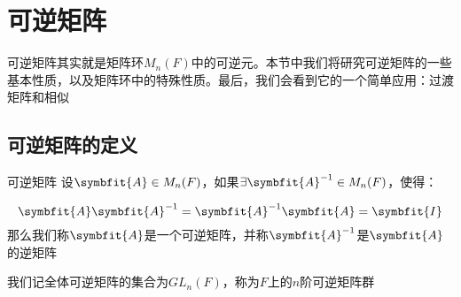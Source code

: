 \documentclass[12pt, a4paper, oneside, UTF8]{ctexbook}
\begin{document}
	\section{可逆矩阵}
		可逆矩阵其实就是矩阵环$M_n(F)$中的可逆元。本节中我们将研究可逆矩阵的一些基本性质，以及矩阵环中的特殊性质。最后，我们会看到它的一个简单应用：过渡矩阵和相似
		\subsection{可逆矩阵的定义}
			\begin{defn}{可逆矩阵}{}
				设$\symbfit{A} \in M_n(F)$，如果$\exists \symbfit{A}^{-1} \in M_n(F)$，使得：

				\begin{equation}
					\symbfit{A}\symbfit{A}^{-1}=\symbfit{A}^{-1}\symbfit{A}=\symbfit{I}
				\end{equation}
				那么我们称$\symbfit{A}$是一个可逆矩阵，并称$\symbfit{A}^{-1}$是$\symbfit{A}$的逆矩阵

				我们记全体可逆矩阵的集合为$GL_n(F)$，称为$F$上的$n$阶可逆矩阵群
			\end{defn}
\end{document}
